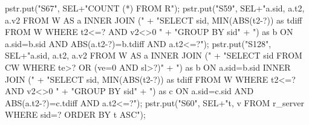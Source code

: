 \documentclass{article}
\def\nwendcode{\endtrivlist \endgroup}      %
\theoremstyle{definition}                   %
\begin{document}
pstr.put("S67", SEL+"COUNT (*) FROM R");
\eatline
{}\nwendcode{}\endmoddef{}
pstr.put("S59", SEL+"a.sid, a.t2, a.v2 FROM W AS a INNER JOIN ("
      + "SELECT sid, MIN(ABS(t2-?)) as tdiff FROM W WHERE t2<=? AND v2<>0 "
      + "GROUP BY sid"
      + ") as b ON a.sid=b.sid AND ABS(a.t2-?)=b.tdiff AND a.t2<=?");
\eatline
{}\nwendcode{}\endmoddef{}
pstr.put("S128", SEL+"a.sid, a.t2, a.v2 FROM W AS a INNER JOIN ("
      + "SELECT sid FROM CW WHERE te>? OR (ve=0 AND sl>?)"
      + ") as b ON a.sid=b.sid INNER JOIN ("
      + "SELECT sid, MIN(ABS(t2-?)) as tdiff FROM W WHERE t2<=? AND v2<>0 "
      + "GROUP BY sid"
      + ") as c ON a.sid=c.sid AND ABS(a.t2-?)=c.tdiff AND a.t2<=?");
\eatline
{}\nwendcode{}\endmoddef{}
pstr.put("S60", SEL+"t, v FROM r_server WHERE sid=? ORDER BY t ASC");
\eatline
{}\nwendcode{}\endmoddef{}
\end{document}
